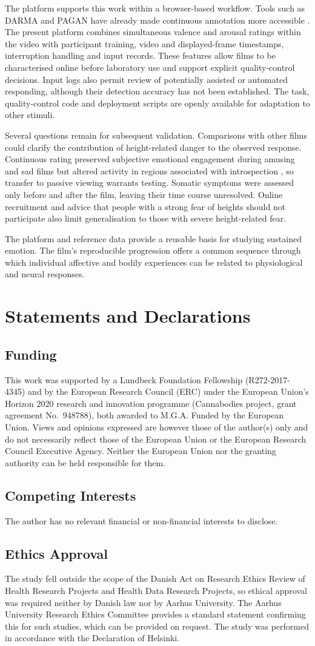 \documentclass[man,12pt,british]{apa7}
\newcommand{\funding}{This work was supported by a Lundbeck Foundation Fellowship (R272-2017-4345) and by the
European Research Council (ERC) under the European Union's Horizon 2020 research and innovation programme
(Cannabodies project, grant agreement No.~948788), both awarded to M.G.A. Funded by the European Union. Views and
opinions expressed are however those of the author(s) only and do not necessarily reflect those of the European Union
or the European Research Council Executive Agency. Neither the European Union nor the granting authority can be held
responsible for them.}
\begin{document}
The platform supports this work within a browser-based workflow. Tools such as DARMA and PAGAN have already made
continuous annotation more accessible \parencite{girard2018darma,melhart2019pagan}. The present platform combines
simultaneous valence and arousal ratings within the video with participant training, video and displayed-frame
timestamps, interruption handling and input records. These features allow films to be characterised online before
laboratory use and support explicit quality-control decisions. Input logs also permit review of potentially assisted
or automated responding, although their detection accuracy has not been established. The task, quality-control code
and deployment scripts are openly available for adaptation to other stimuli.

Several questions remain for subsequent validation. Comparisons with other films could clarify the contribution of
height-related danger to the observed response. Continuous rating preserved subjective emotional engagement during
amusing and sad films but altered activity in regions associated with introspection
\parencite{hutcherson2005attention}, so transfer to passive viewing warrants testing. Somatic symptoms were assessed
only before and after the film, leaving their time course unresolved. Online recruitment and advice that people with
a strong fear of heights should not participate also limit generalisation to those with severe height-related fear.

The platform and reference data provide a reusable basis for studying sustained emotion. The film's reproducible
progression offers a common sequence through which individual affective and bodily experiences can be related to
physiological and neural responses.

\section*{Statements and Declarations}

\subsection*{Funding}
\funding

\subsection*{Competing Interests}
The author has no relevant financial or non-financial interests to disclose.

\subsection*{Ethics Approval}
The study fell outside the scope of the Danish Act on Research Ethics Review of Health Research Projects and Health
Data Research Projects, so ethical approval was required neither by Danish law nor by Aarhus University. The Aarhus
University Research Ethics Committee provides a standard statement confirming this for such studies, which can be
provided on request. The study was performed in accordance with the Declaration of Helsinki.
\end{document}
